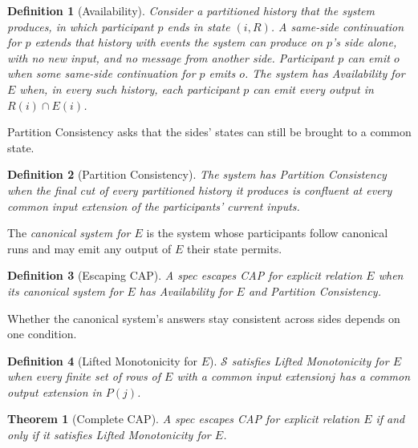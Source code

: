 \documentclass[sigconf]{cidr-2027}
\newtheorem{theorem}{Theorem}
\newtheorem{definition}{Definition}
\theoremstyle{remark}
\newcommand{\indesc}{input extension\xspace} %
\newcommand{\outnoun}{output extension\xspace}%
\newcommand{\Spec}{\mathcal{S}}
\newcommand{\fiber}[1]{P(#1)}
\begin{document}
\begin{definition}[Availability]
\label{def:partition-notions}
Consider a partitioned history that the system produces, in which participant
$p$ ends in state $(i,R)$.  A \emph{same-side continuation} for $p$ extends that
history with events the system can produce on $p$'s side alone, with no new
input, and no message from another side.  Participant $p$ can emit $o$ when some same-side continuation for $p$ emits
$o$.  The system has \emph{Availability for $E$} when, in every
such history, each participant $p$ can emit every output in $R(i)\cap E(i)$.
\end{definition}

Partition Consistency asks that the sides' states can still be brought to a
common state.

\begin{definition}[Partition Consistency]
\label{def:partition-consistency}
The system has \emph{Partition Consistency} when the final cut of every
partitioned history it produces is confluent at every common \indesc of the
participants' current inputs.
\end{definition}

The \emph{canonical system for $E$} is the system whose participants follow
canonical runs and may emit any output of $E$ their state permits.

\begin{definition}[Escaping CAP]
\label{def:escapes-cap}
A spec \emph{escapes CAP} for explicit relation $E$ when its canonical system for $E$ has
Availability for $E$ and Partition Consistency.
\end{definition}

Whether the canonical system's answers stay consistent across sides depends on
one condition.

\begin{definition}[Lifted Monotonicity for $E$]
\label{def:lm-for-A}
$\Spec$ satisfies \emph{Lifted Monotonicity for $E$} when every finite set of
rows of $E$ with a common \indesc $j$ has a common \outnoun in $\fiber{j}$.
\end{definition}

\begin{theorem}[Complete CAP]
\label{thm:complete-cap}
A spec escapes CAP for explicit relation $E$ if and only if it satisfies Lifted Monotonicity for
$E$.
\end{theorem}
\end{document}
